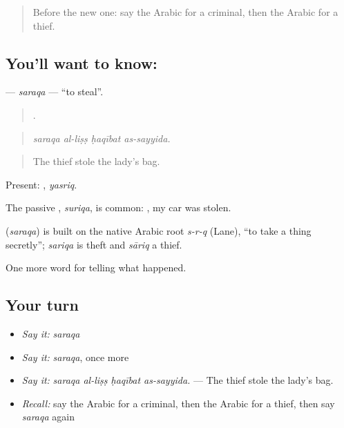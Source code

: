 \label{lesson:AR-C300-saraqa}



\begin{quote}
Before the new one: say the Arabic for a criminal, then the Arabic for a thief.
\end{quote}

\subsection*{You'll want to know: }
\textbf{} — \emph{saraqa} — \textquotedblleft{}to steal\textquotedblright{}.

\begin{quote}
   .
\end{quote}

\begin{quote}
\emph{saraqa al-liṣṣ ḥaqībat as-sayyida.}
\end{quote}

\begin{quote}
The thief stole the lady’s bag.
\end{quote}

Present: , \emph{yasriq}.

The passive , \emph{suriqa}, is common:  , my car was stolen.

\begin{cousinweb}
\textbf{} (\emph{saraqa}) is built on the native Arabic root \emph{s-r-q} (Lane), \textquotedblleft{}to take a thing secretly\textquotedblright{}; \emph{sariqa} is theft and \emph{sāriq} a thief.
\end{cousinweb}

\begin{grammarlens}[title={What you've built}]
One more word for telling what happened.
\end{grammarlens}

\subsection*{Your turn}
\begin{itemize}
\raggedright
  \item \emph{Say it:} \emph{saraqa}
  \item \emph{Say it:} \emph{saraqa}, once more
  \item \emph{Say it:} \emph{saraqa al-liṣṣ ḥaqībat as-sayyida.} — The thief stole the lady’s bag.
  \item \emph{Recall:} say the Arabic for a criminal, then the Arabic for a thief, then say \emph{saraqa} again
\end{itemize}

